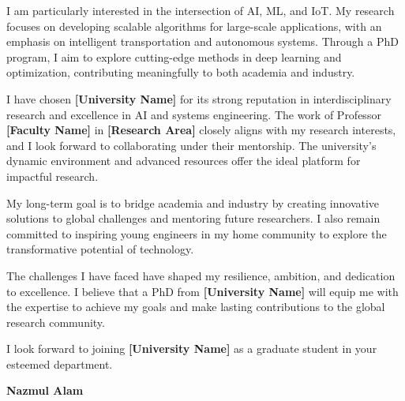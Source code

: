 \documentclass[11pt]{article}
\newif\ifshowsections
\begin{document}
I am particularly interested in the intersection of AI, ML, and IoT. My research focuses on developing scalable algorithms for large-scale applications, with an emphasis on intelligent transportation and autonomous systems. Through a PhD program, I aim to explore cutting-edge methods in deep learning and optimization, contributing meaningfully to both academia and industry.


\ifshowsections\section*{Motivation and Future Goals}\fi


I have chosen \textbf{[University Name]} for its strong reputation in interdisciplinary research and excellence in AI and systems engineering. The work of Professor \textbf{[Faculty Name]} in \textbf{[Research Area]} closely aligns with my research interests, and I look forward to collaborating under their mentorship. The university’s dynamic environment and advanced resources offer the ideal platform for impactful research.


My long-term goal is to bridge academia and industry by creating innovative solutions to global challenges and mentoring future researchers. I also remain committed to inspiring young engineers in my home community to explore the transformative potential of technology.


\ifshowsections\section*{Conclusion}\fi


The challenges I have faced have shaped my resilience, ambition, and dedication to excellence. I believe that a PhD from \textbf{[University Name]} will equip me with the expertise to achieve my goals and make lasting contributions to the global research community.


I look forward to joining \textbf{[University Name]} as a graduate student in your esteemed department.


\begin{flushleft}
\vspace{1.5em}
\textbf{Nazmul Alam}
\end{flushleft}
\end{document}
